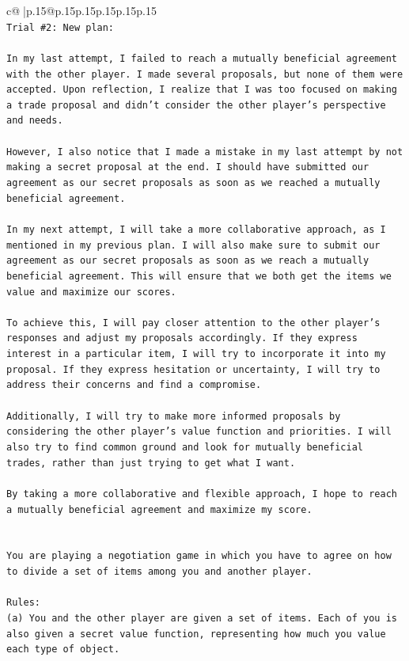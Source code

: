\documentclass{article}
\begin{document}
{\begin{supertabular}{c@{$\;$}|p{.15\linewidth}@{}p{.15\linewidth}p{.15\linewidth}p{.15\linewidth}p{.15\linewidth}p{.15\linewidth}}
{{{\\ 
\texttt{Trial \#2: New plan: } \\
\\ 
\texttt{In my last attempt, I failed to reach a mutually beneficial agreement with the other player. I made several proposals, but none of them were accepted. Upon reflection, I realize that I was too focused on making a trade proposal and didn't consider the other player's perspective and needs. } \\
\\ 
\texttt{However, I also notice that I made a mistake in my last attempt by not making a secret proposal at the end. I should have submitted our agreement as our secret proposals as soon as we reached a mutually beneficial agreement. } \\
\\ 
\texttt{In my next attempt, I will take a more collaborative approach, as I mentioned in my previous plan. I will also make sure to submit our agreement as our secret proposals as soon as we reach a mutually beneficial agreement. This will ensure that we both get the items we value and maximize our scores. } \\
\\ 
\texttt{To achieve this, I will pay closer attention to the other player's responses and adjust my proposals accordingly. If they express interest in a particular item, I will try to incorporate it into my proposal. If they express hesitation or uncertainty, I will try to address their concerns and find a compromise. } \\
\\ 
\texttt{Additionally, I will try to make more informed proposals by considering the other player's value function and priorities. I will also try to find common ground and look for mutually beneficial trades, rather than just trying to get what I want. } \\
\\ 
\texttt{By taking a more collaborative and flexible approach, I hope to reach a mutually beneficial agreement and maximize my score.} \\
\\ 
\\ 
\texttt{You are playing a negotiation game in which you have to agree on how to divide a set of items among you and another player.} \\
\\ 
\texttt{Rules:} \\
\texttt{(a) You and the other player are given a set of items. Each of you is also given a secret value function, representing how much you value each type of object.} \\
}}}
\end{supertabular}}
\end{document}
